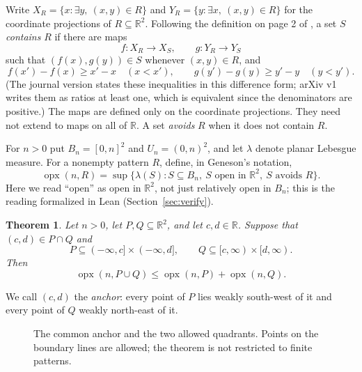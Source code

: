 \documentclass[11pt]{article}
\newtheorem{theorem}{Theorem}
\DeclareMathOperator{\opx}{opx}
\newcommand{\R}{\mathbb R}
\newcommand{\area}{\lambda}
\begin{document}
Write $X_R=\{x:\exists y,\ (x,y)\in R\}$ and $Y_R=\{y:\exists x,\ (x,y)\in R\}$ for the coordinate projections of $R\subseteq\R^2$. Following the definition on page 2 of \cite{Geneson}, a set $S$ \emph{contains} $R$ if there are maps
\[
 f:X_R\longrightarrow X_S,\qquad g:Y_R\longrightarrow Y_S
\]
such that $(f(x),g(y))\in S$ whenever $(x,y)\in R$, and
\begin{equation}\label{eq:expand}
 f(x')-f(x)\ge x'-x\quad(x<x'),\qquad
 g(y')-g(y)\ge y'-y\quad(y<y').
\end{equation}
(The journal version states these inequalities in this difference form; arXiv v1 writes them as ratios at least one, which is equivalent since the denominators are positive.) The maps are defined only on the coordinate projections. They need not extend to maps on all of $\R$. A set \emph{avoids} $R$ when it does not contain $R$.

For $n>0$ put $B_n=[0,n]^2$ and $U_n=(0,n)^2$, and let $\area$ denote planar Lebesgue measure. For a nonempty pattern $R$, define, in Geneson's notation,
\begin{equation}\label{eq:opx}
 \opx(n,R)=\sup\{\area(S):S\subseteq B_n,\ S\text{ open in }\R^2,\ S\text{ avoids }R\}.
\end{equation}
Here we read ``open'' as open in $\R^2$, not just relatively open in $B_n$; this is the reading formalized in Lean (Section~\ref{sec:verify}).

\begin{theorem}\label{thm:main}
Let $n>0$, let $P,Q\subseteq\R^2$, and let $c,d\in\R$. Suppose that $(c,d)\in P\cap Q$ and
\[
 P\subseteq(-\infty,c]\times(-\infty,d],\qquad
 Q\subseteq[c,\infty)\times[d,\infty).
\]
Then
\[
 \opx(n,P\cup Q)\le \opx(n,P)+\opx(n,Q).
\]
\end{theorem}

We call $(c,d)$ the \emph{anchor}: every point of $P$ lies weakly south-west of it and every point of $Q$ weakly north-east of it.

\begin{figure}[ht]
\centering
{}
\caption{The common anchor and the two allowed quadrants. Points on the boundary lines are allowed; the theorem is not restricted to finite patterns.}
\end{figure}
\end{document}
